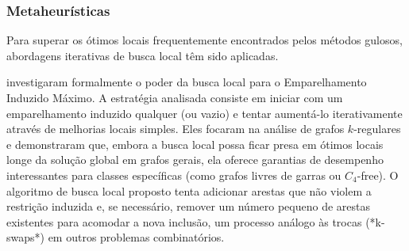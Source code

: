 \subsubsection{Metaheurísticas}

Para superar os ótimos locais frequentemente encontrados pelos métodos gulosos, abordagens iterativas de busca local têm sido aplicadas.

 investigaram formalmente o poder da busca local para o Emparelhamento Induzido Máximo. A estratégia analisada consiste em iniciar com um emparelhamento induzido qualquer (ou vazio) e tentar aumentá-lo iterativamente através de melhorias locais simples.
Eles focaram na análise de grafos $k$-regulares e demonstraram que, embora a busca local possa ficar presa em ótimos locais longe da solução global em grafos gerais, ela oferece garantias de desempenho interessantes para classes específicas (como grafos livres de garras ou $C_4$-free). O algoritmo de busca local proposto tenta adicionar arestas que não violem a restrição induzida e, se necessário, remover um número pequeno de arestas existentes para acomodar a nova inclusão, um processo análogo às trocas (*k-swaps*) em outros problemas combinatórios.

